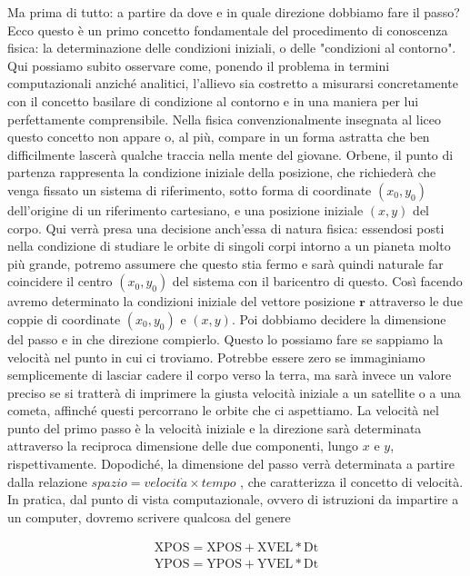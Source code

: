 Ma prima di tutto: a partire da dove e in quale direzione dobbiamo fare il passo? Ecco questo è un primo concetto fondamentale del procedimento di conoscenza fisica: la determinazione delle condizioni iniziali, o delle "condizioni al contorno". Qui possiamo subito osservare come, ponendo il problema in termini computazionali anziché analitici, l'allievo sia costretto a misurarsi concretamente con il  concetto basilare di condizione al contorno e in una maniera per lui perfettamente comprensibile. Nella fisica convenzionalmente insegnata al liceo questo concetto non appare o, al più, compare in un forma astratta che ben difficilmente lascerà qualche traccia nella mente del giovane. Orbene, il punto di partenza rappresenta la condizione iniziale della posizione, che richiederà che venga fissato un sistema di riferimento, sotto forma di coordinate $(x_0,y_0)$ dell'origine di un riferimento cartesiano, e una posizione iniziale $(x,y)$ del corpo. Qui verrà presa una decisione anch'essa di natura fisica: essendosi posti nella condizione di studiare le orbite di singoli corpi intorno a un pianeta molto più grande, potremo assumere che questo stia fermo e sarà quindi naturale far coincidere il centro $(x_0,y_0)$ del sistema con il baricentro di questo. Così facendo avremo determinato la condizioni iniziale del vettore posizione $\mathbf{r}$ attraverso le due coppie di coordinate $(x_0,y_0)$ e $(x,y)$. Poi dobbiamo decidere la dimensione del passo e in che direzione compierlo. Questo lo possiamo fare se sappiamo la velocità nel punto in cui ci troviamo. Potrebbe essere zero se immaginiamo semplicemente di lasciar cadere il corpo verso la terra, ma sarà invece un valore preciso se si tratterà di imprimere la giusta velocità iniziale a un satellite o a una cometa, affinché questi percorrano le orbite che ci aspettiamo. La velocità nel punto del primo passo è la velocità iniziale e la direzione sarà determinata attraverso la reciproca dimensione delle due componenti, lungo $x$ e $y$, rispettivamente. Dopodiché, la dimensione del passo verrà determinata a partire dalla relazione $spazio = velocit\grave{a} \times tempo$ ,  che caratterizza il concetto di velocità. In pratica, dal punto di vista computazionale, ovvero di istruzioni da impartire a un computer, dovremo scrivere qualcosa del genere

\begin{equation} \label{eq:pos}
\begin{array}{ll}
\textrm{XPOS}=\textrm{XPOS}+\textrm{XVEL}*\textrm{Dt}\\
\textrm{YPOS}=\textrm{YPOS}+\textrm{YVEL}*\textrm{Dt}\\
\end{array}
\end{equation}

